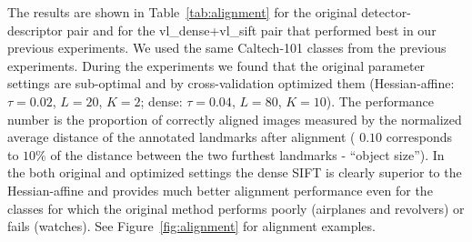 \documentclass[review]{elsarticle}
\begin{document}
The results are shown in Table~\ref{tab:alignment}
for the original detector-descriptor pair and for the
vl\_dense+vl\_sift pair that performed best in our previous experiments.
We used the same Caltech-101 classes from the
previous experiments. During the experiments we found that
the original parameter settings are sub-optimal
and by cross-validation optimized them
(Hessian-affine: $\tau=0.02$, $L=20$, $K=2$;
dense: $\tau=0.04$, $L=80$, $K=10$).
The performance number is the proportion of correctly
aligned images measured by the normalized average distance
of the annotated landmarks after alignment (
$0.10$ corresponds to $10\%$ of the distance between the two
furthest landmarks - ``object size''). In the both original and optimized settings
the dense SIFT is clearly superior to the Hessian-affine and
provides much better alignment performance even for the classes
for which the original method performs poorly (airplanes and
revolvers) or fails (watches). See Figure~\ref{fig:alignment} for
alignment examples.
%
\end{document}
